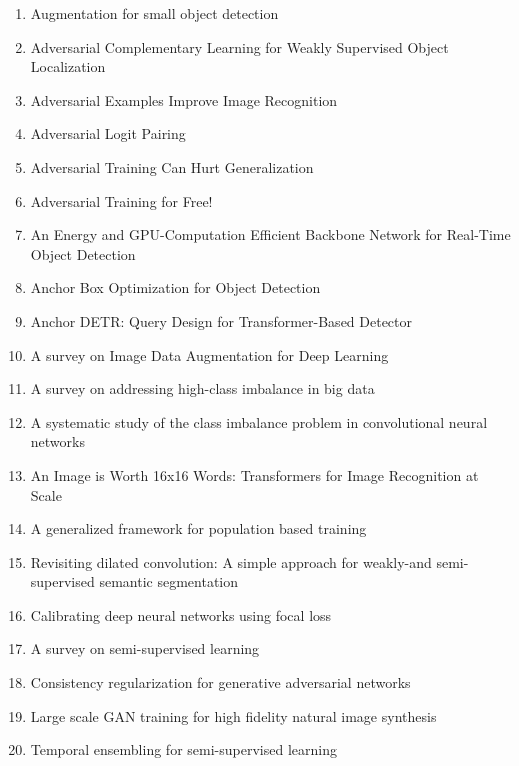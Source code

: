 \documentclass[acmlarge]{acmart}
\begin{document}
\begin{enumerate}
	\item Augmentation for small object detection \cite{Kisantal2019AugmentationFS}
	\item Adversarial Complementary Learning for Weakly Supervised Object Localization \cite{Zhang2018AdversarialCL}
	\item Adversarial Examples Improve Image Recognition \cite{Xie2020AdversarialEI}
	\item Adversarial Logit Pairing \cite{Kannan2018AdversarialLP}
	\item Adversarial Training Can Hurt Generalization \cite{Raghunathan2019AdversarialTC}
	\item Adversarial Training for Free! \cite{Shafahi2019AdversarialTF}
	\item An Energy and GPU-Computation Efficient Backbone Network for Real-Time Object Detection \cite{Lee2019AnEA}
	\item Anchor Box Optimization for Object Detection \cite{Zhong2020AnchorBO}
	\item Anchor DETR: Query Design for Transformer-Based Detector \cite{Wang2021AnchorDQ}
	\item A survey on Image Data Augmentation for Deep Learning \cite{Shorten2019ASO}
	\item A survey on addressing high-class imbalance in big data \cite{Leevy2018ASO}
	\item A systematic study of the class imbalance problem in convolutional neural networks \cite{Buda2018ASS}
	\item An Image is Worth 16x16 Words: Transformers for Image Recognition at Scale \cite{Dosovitskiy2021AnII}
	\item A generalized framework for population based training \cite{li2019generalized}
	\item Revisiting dilated convolution: A simple approach for weakly-and semi-supervised semantic segmentation \cite{wei2018revisiting}
	\item Calibrating deep neural networks using focal loss \cite{mukhoti2020calibrating}
	\item A survey on semi-supervised learning \cite{van2020survey}
	\item Consistency regularization for generative adversarial networks \cite{zhang2019consistency}
	\item Large scale GAN training for high fidelity natural image synthesis \cite{brock2018large}
	\item Temporal ensembling for semi-supervised learning \cite{laine2016temporal}

\end{enumerate}
\end{document}
